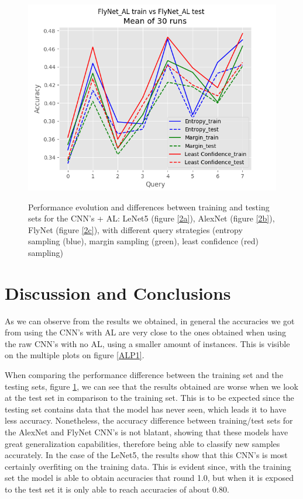 \documentclass[journal, a4paper]{IEEEtran}
\begin{document}
\begin{figure}[htpb]
{        \includegraphics[scale=0.4]{FlyNet_TT_AL.png}
    }
    \caption{Performance evolution and differences between training and testing sets for the 
    CNN's + AL: LeNet5 (figure \ref{2a}), AlexNet (figure \ref{2b}), FlyNet (figure \ref{2c}), 
    with different query strategies (entropy sampling (blue), 
    margin sampling (green), least confidence (red) sampling)}
    \label{ALP2} 
\end{figure}

\section{Discussion and Conclusions}

As we can observe from the results we obtained, in general the accuracies we got from using
the CNN's with AL are very close to the ones obtained when using the raw CNN's with no AL,
using a smaller amount of instances. This is visible on the multiple plots on figure \ref{ALP1}. 

When comparing the performance difference
between the training set and the testing sets, figure \ref{ALP2}, we can see that the results 
obtained are worse when we look at the test set in comparison to the training set. This is
to be expected since the testing set contains data that the model has never seen,
which leads it to have less accuracy. Nonetheless, the accuracy difference between training/test
sets for the AlexNet and FlyNet CNN's is not blatant, showing that these models have great 
generalization capabilities, therefore being able to classify new samples accurately.
In the case of the LeNet5, the results show that this CNN's is most certainly overfiting on 
the training data. This is evident since, with the training set the model is able to obtain
accuracies that round 1.0, but when it is exposed to the test set it is only able to reach
accuracies of about 0.80.
\end{document}
